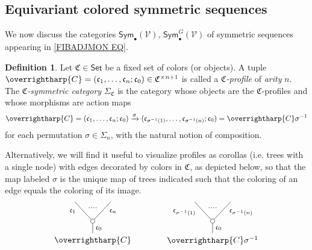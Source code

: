 \documentclass[a4paper,10pt
]{article}%
\numberwithin{equation}{section}
\numberwithin{figure}{section}
\theoremstyle{definition} %
\newtheorem{definition}[equation]{Definition}%
\newcommand{\vect}[1]{\text{\overrightharp{\ensuremath{#1}}}}
\newcommand{\V}{\ensuremath{\mathcal V}}
\newcommand{\1}{\ensuremath{\mathbbm 1}}%
\begin{document}
\subsection{Equivariant colored symmetric sequences}
\label{EQCOSYMSEQ SEC}

We now discuss the categories
$\mathsf{Sym}_{\bullet}(\V)$,
$\mathsf{Sym}^G_{\bullet}(\V)$
of symmetric sequences appearing in \eqref{FIBADJMON EQ}.


\begin{definition}\label{CSYM DEF}
	Let $\mathfrak {C} \in \mathsf{Set}$ be a fixed set of colors (or objects).
	A tuple
	$\vect C = (\mathfrak c_1, \dots, \mathfrak c_n; \mathfrak c_0) \in \mathfrak{C}^{\times n+1}$
	is called a \textit{$\mathfrak {C}$-profile} of \textit{arity} $n$.
	The \textit{$\mathfrak C$-symmetric category} $\Sigma_{\mathfrak C}$ is the category whose objects are the $\mathfrak{C}$-profiles and whose morphisms are action maps
	\begin{equation}\label{CSYM EQ1}
	\vect{C} =
	(\mathfrak c_1, \dots, \mathfrak c_n; \mathfrak c_0) \xrightarrow{\sigma} (\mathfrak c_{\sigma^{-1}(1)}, \dots, \mathfrak c_{\sigma^{-1}(n)}; \mathfrak c_0)
	= \vect{C} \sigma^{-1}
	\end{equation}
	for each permutation $\sigma \in \Sigma_n$, with the natural notion of composition.
	
	Alternatively, we will find it useful to visualize profiles as corollas (i.e. trees with a single node)
	with edges decorated by colors in $\mathfrak{C}$, as depicted below, so that the map labeled $\sigma$
	is the unique map of trees indicated such that the coloring of an edge equals the coloring of its image.
	\begin{equation}\label{CSYM EQ2}
	\begin{tikzpicture}
	[grow=up,auto,level distance=2.3em,every node/.style = {font=\footnotesize},dummy/.style={circle,draw,inner sep=0pt,minimum size=1.75mm}]
	
	\node at (0,0) [font=\normalsize]{$\vect{C}$}
	child{node [dummy] {}
		child{
			edge from parent node [swap,near end] {$\mathfrak c_n$} node [name=Kn] {}}
		child{
			edge from parent node [near end] {$\mathfrak c_1$}
			node [name=Kone,swap] {}}
		edge from parent node [swap] {$\mathfrak c_0$}
	};
	\draw [dotted,thick] (Kone) -- (Kn) ;
	\node at (5,0) [font=\normalsize] {$\vect{C} \sigma^{-1}
		$}
	child{node [dummy] {}
		child{
			edge from parent node [swap,near end] {$\mathfrak c_{\sigma^{-1}(n)}$} node [name=Kn] {}}
		child{
			edge from parent node [near end] {$\mathfrak c_{\sigma^{-1}(1)}$}
			node [name=Kone,swap] {}}
		edge from parent node [swap] {$\mathfrak c_0$}
	};
	\draw [dotted,thick] (Kone) -- (Kn) ;
	

\end{tikzpicture}
\end{equation}
\end{definition}
\end{document}
